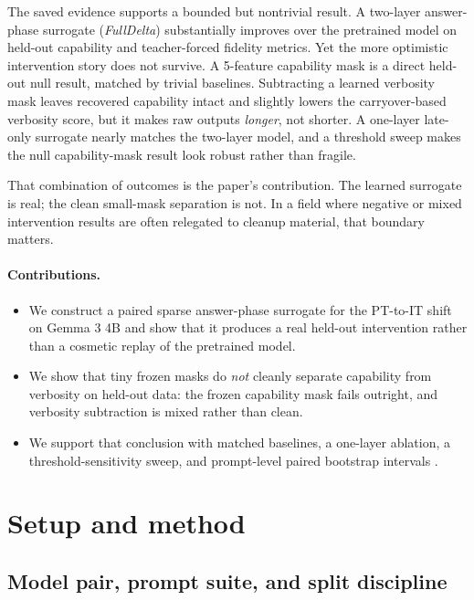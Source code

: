 \documentclass[11pt]{article}
\begin{document}
The saved evidence supports a bounded but nontrivial result. A two-layer answer-phase surrogate (\emph{FullDelta}) substantially improves over the pretrained model on held-out capability and teacher-forced fidelity metrics. Yet the more optimistic intervention story does not survive. A 5-feature capability mask is a direct held-out null result, matched by trivial baselines. Subtracting a learned verbosity mask leaves recovered capability intact and slightly lowers the carryover-based verbosity score, but it makes raw outputs \emph{longer}, not shorter. A one-layer late-only surrogate nearly matches the two-layer model, and a threshold sweep makes the null capability-mask result look robust rather than fragile.

That combination of outcomes is the paper's contribution. The learned surrogate is real; the clean small-mask separation is not. In a field where negative or mixed intervention results are often relegated to cleanup material, that boundary matters.

\paragraph{Contributions.}
\begin{itemize}
    \item We construct a paired sparse answer-phase surrogate for the PT-to-IT shift on Gemma 3 4B and show that it produces a real held-out intervention rather than a cosmetic replay of the pretrained model.
    \item We show that tiny frozen masks do \emph{not} cleanly separate capability from verbosity on held-out data: the frozen capability mask fails outright, and verbosity subtraction is mixed rather than clean.
    \item We support that conclusion with matched baselines, a one-layer ablation, a threshold-sensitivity sweep, and prompt-level paired bootstrap intervals \citep{efron1994introduction}.
\end{itemize}

\section{Setup and method}

\subsection{Model pair, prompt suite, and split discipline}
\end{document}

